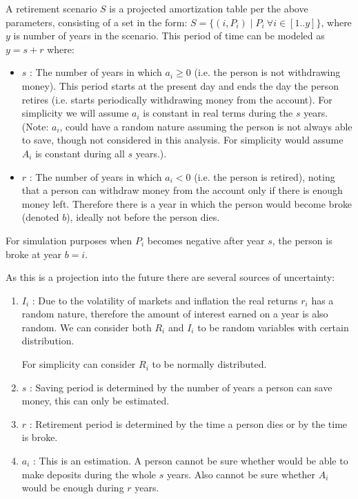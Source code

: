 \documentclass[8pt]{article}
\begin{document}
A retirement scenario $S$ is a projected amortization table per the above parameters, consisting of a set in the form: $S= \{ (i,P_i) \mid  P_i ~ \forall i \in [1..y] \}$, where $y$ is number of years in the scenario.  This period of time can be modeled as $y=s+r$ where:
\begin{itemize}
\item $s$ : The number of years in which $a_i \geq 0$ (i.e. the person is not withdrawing money).  This period starts at the present day and ends the day the person retires (i.e. starts periodically withdrawing money from the account).  For simplicity we will assume $a_i$ is constant in real terms during the $s$ years. \\
(Note: $a_i$, could have a random nature assuming the person is not always able to save, though not considered in this analysis.  For simplicity would assume $A_i$ is constant during all $s$ years.).
\item $r$ : The number of years in which $a_i < 0$ (i.e. the person is retired), noting that a person can withdraw money from the account only if there is enough money left.  Therefore there is a year in which the person would become broke (denoted $b$), ideally not before the person dies.  

\end{itemize}

For simulation purposes when $P_i$ becomes negative after year $s$, the person is broke at year $b=i$.


As this is a projection into the future there are several sources of uncertainty:

\begin{enumerate}
\item $I_i$ : Due to the volatility of markets and inflation the real returns $r_i$ has a random nature, therefore the amount of interest earned on a year is also random.  We can consider both $R_i$ and $I_i$ to be random variables with certain distribution.  

For simplicity can consider $R_i$ to be normally distributed.

\item $s$ : Saving period is determined by the number of years a person can save money, this can only be estimated.

\item $r$ : Retirement period is determined by the time a person dies or by the time is broke.

\item $a_i$ : This is an estimation.  A person cannot be sure whether would be able to make deposits during the whole $s$ years.  Also cannot be sure whether $A_i$ would be enough during $r$ years.
\end{enumerate}
\end{document}
